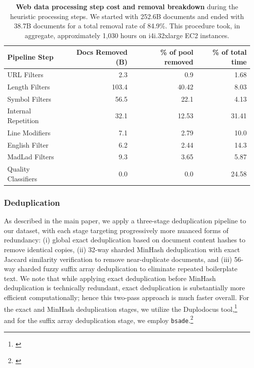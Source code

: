\documentclass[table]{ai2style/ai2}
\begin{document}
{{\begin{table}[h]
\centering
\begin{tabular}{lrrr}
\toprule
{\bf Pipeline Step} & {\bf Docs Removed (B)} & {\bf \% of pool removed} & {\bf \% of total time} \\
\midrule
\rowcolor{ai2offwhite} URL Filters & 2.3 & 0.9 & 1.68 \\
Length Filters & 103.4 & 40.42 & 8.03 \\
\rowcolor{ai2offwhite} Symbol Filters & 56.5 & 22.1 & 4.13 \\
Internal Repetition & 32.1 & 12.53 & 31.41 \\
\rowcolor{ai2offwhite} Line Modifiers & 7.1 & 2.79 & 10.0 \\
English Filter & 6.2 & 2.44 & 14.3 \\
\rowcolor{ai2offwhite} MadLad Filters & 9.3 & 3.65 & 5.87 \\
Quality Classifiers & 0.0 & 0.0 & 24.58 \\
\bottomrule
\end{tabular}
\caption{\textbf{Web data processing step cost and removal breakdown} during the heuristic processing steps. We started with 252.6B documents and ended with 38.7B documents for a total removal rate of 84.9\%. This procedure took, in aggregate, approximately 1,030 hours on i4i.32xlarge EC2 instances.}
\label{tab:cc_pipeline_stats}
\end{table}

\subsubsection{Deduplication}

As described in the main paper, we apply a three-stage deduplication pipeline to our dataset, with each stage targeting progressively more nuanced forms of redundancy: (i) global exact deduplication based on document content hashes to remove identical copies, (ii) 32-way sharded MinHash deduplication with exact Jaccard similarity verification to remove near-duplicate documents, and (iii) 56-way sharded fuzzy suffix array deduplication to eliminate repeated boilerplate text. We note that while applying exact deduplication before MinHash deduplication is technically redundant, exact deduplication is substantially more efficient computationally; hence this two-pass approach is much faster overall. For the exact and MinHash deduplication stages, we utilize the Duplodocus tool,\footnote{\href{https://github.com/allenai/duplodocus}{}} and for the suffix array deduplication stage, we employ \texttt{bsade}.\footnote{\href{https://github.com/liujch1998/bsade/}{}}

}}
\end{document}
